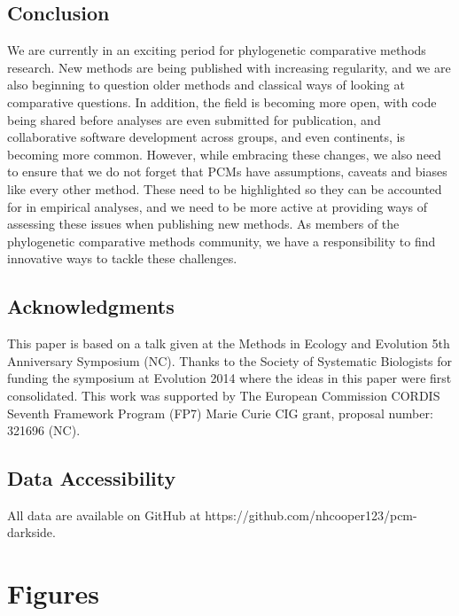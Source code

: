 \documentclass[a4paper,12pt]{article}
\begin{document}
  \subsection{Conclusion}
    We are currently in an exciting period for phylogenetic comparative methods research.
    New methods are being published with increasing regularity, and we are also beginning to question older methods and classical ways of looking at comparative questions. 
    In addition, the field is becoming more open, with code being shared before analyses are even submitted for publication, and collaborative software development across groups, and even continents, is becoming more common.
    However, while embracing these changes, we also need to ensure that we do not forget that PCMs have assumptions, caveats and biases like every other method. 
    These need to be highlighted so they can be accounted for in empirical analyses, and we need to be more active at providing ways of assessing these issues when publishing new methods.
    As members of the phylogenetic comparative methods community, we have a responsibility to find innovative ways to tackle these challenges. 

  \subsection{Acknowledgments}
    This paper is based on a talk given at the Methods in Ecology and Evolution 5th Anniversary Symposium (NC).
    Thanks to the Society of Systematic Biologists for funding the symposium at Evolution 2014 where the ideas in this paper were first consolidated. 
    This work was supported by The European Commission CORDIS Seventh Framework Program (FP7) Marie Curie CIG grant, proposal number: 321696 (NC).

  \subsection{Data Accessibility}
    All data are available on GitHub at https://github.com/nhcooper123/pcm-darkside.




\newpage
\section{Figures}
\end{document}
